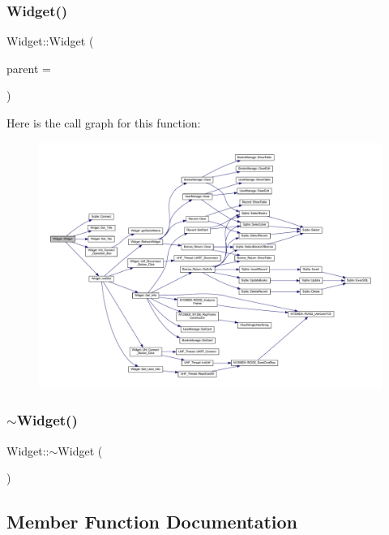 \subsubsection{\texorpdfstring{Widget()}{Widget()}}
{\footnotesize\ttfamily Widget\+::\+Widget (\begin{DoxyParamCaption}\item[{Q\+Widget $\ast$}]{parent = {} }\end{DoxyParamCaption})}

Here is the call graph for this function\+:
\nopagebreak
\begin{figure}[H]
\begin{center}
\leavevmode
\includegraphics[width=350pt]{class_widget_a29531c7f141e461322981b3b579d4590_cgraph}
\end{center}
\end{figure}
\mbox{\label{class_widget_aa24f66bcbaaec6d458b0980e8c8eae65}} 
\subsubsection{\texorpdfstring{$\sim$Widget()}{~Widget()}}
{\footnotesize\ttfamily Widget\+::$\sim$\+Widget (\begin{DoxyParamCaption}{ }\end{DoxyParamCaption})}



\subsection{Member Function Documentation}
\mbox{\label{class_widget_a0b1204d50863ef19c6ed3e39ab455d25}} 
